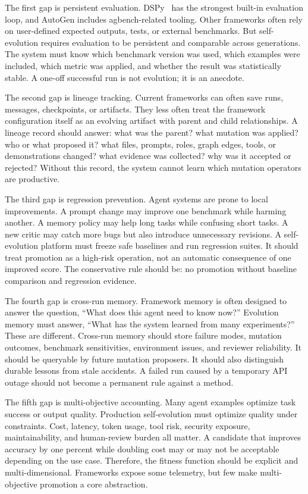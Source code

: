 The first gap is persistent evaluation.  DSPy~\cite{dspy2023} has the strongest built-in evaluation loop, and AutoGen includes agbench-related tooling.  Other frameworks often rely on user-defined expected outputs, tests, or external benchmarks.  But self-evolution requires evaluation to be persistent and comparable across generations.  The system must know which benchmark version was used, which examples were included, which metric was applied, and whether the result was statistically stable.  A one-off successful run is not evolution; it is an anecdote.

The second gap is lineage tracking.  Current frameworks can often save runs, messages, checkpoints, or artifacts.  They less often treat the framework configuration itself as an evolving artifact with parent and child relationships.  A lineage record should answer: what was the parent? what mutation was applied? who or what proposed it? what files, prompts, roles, graph edges, tools, or demonstrations changed? what evidence was collected? why was it accepted or rejected? Without this record, the system cannot learn which mutation operators are productive.

The third gap is regression prevention.  Agent systems are prone to local improvements.  A prompt change may improve one benchmark while harming another.  A memory policy may help long tasks while confusing short tasks.  A new critic may catch more bugs but also introduce unnecessary revisions.  A self-evolution platform must freeze safe baselines and run regression suites.  It should treat promotion as a high-risk operation, not an automatic consequence of one improved score.  The conservative rule should be: no promotion without baseline comparison and regression evidence.

The fourth gap is cross-run memory.  Framework memory is often designed to answer the question, ``What does this agent need to know now?'' Evolution memory must answer, ``What has the system learned from many experiments?'' These are different.  Cross-run memory should store failure modes, mutation outcomes, benchmark sensitivities, environment issues, and reviewer reliability.  It should be queryable by future mutation proposers.  It should also distinguish durable lessons from stale accidents.  A failed run caused by a temporary API outage should not become a permanent rule against a method.

The fifth gap is multi-objective accounting.  Many agent examples optimize task success or output quality.  Production self-evolution must optimize quality under constraints.  Cost, latency, token usage, tool risk, security exposure, maintainability, and human-review burden all matter.  A candidate that improves accuracy by one percent while doubling cost may or may not be acceptable depending on the use case.  Therefore, the fitness function should be explicit and multi-dimensional.  Frameworks expose some telemetry, but few make multi-objective promotion a core abstraction.

